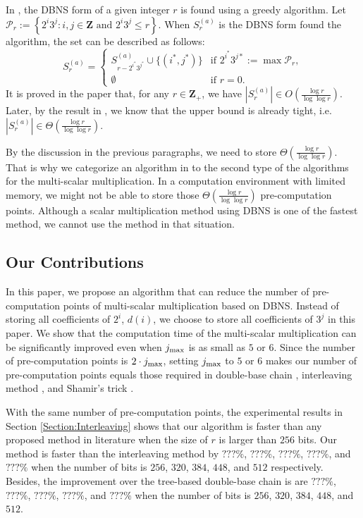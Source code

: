 In \cite{dbns2}, the DBNS form of a given integer $r$ is found using a greedy algorithm. Let $\mathcal{P}_r := \left\{ 2^i3^j : i,j \in \mathbf{Z} \text{ and } 2^i3^j \leq r \right\}$. When $S^{(a)}_r$ is the DBNS form found the algorithm, the set can be described as follows:
\[
S^{(a)}_r =
\begin{cases}
S^{(a)}_{r - 2^{i^*}3^{j^*}} \cup \{(i^*, j^*)\} & \text{if } 2^{i^*}3^{j*} := \max \mathcal{P}_r, \\
\emptyset       & \text{if } r = 0.
\end{cases}
\]
It is proved in the paper that, for any $r \in \mathbf{Z}_+$, we have $\left|S_r^{(a)}\right| \in O(\frac{\log r}{\log \log r})$. Later, by the result in \cite{dbns3}, we know that the upper bound is already tight, i.e. $\left|S_r^{(a)}\right| \in \Theta(\frac{\log r}{\log \log r})$.

By the discussion in the previous paragraphs, we need to store $\Theta(\frac{\log r}{\log \log r})$. That is why we categorize an algorithm in \cite{dbns} to the second type of the algorithms for the multi-scalar multiplication. In a computation environment with limited memory, we might not be able to store those $\Theta(\frac{\log r}{\log \log r})$ pre-computation points. Although a scalar multiplication method using DBNS is one of the fastest method, we cannot use the method in that situation.

\subsection{Our Contributions}

In this paper, we propose an algorithm that can reduce the number of pre-computation points of multi-scalar multiplication based on DBNS. Instead of storing all coefficients of $2^i$, $d(i)$, we choose to store all coefficients of $3^j$ in this paper. We show that the computation time of the multi-scalar multiplication can be significantly improved even when $j_{\rm max}$ is as small as $5$ or $6$. Since the number of pre-computation points is $2 \cdot j_{\rm max}$, setting $j_{\rm max}$ to $5$ or $6$ makes our number of pre-computation points equals those required in double-base chain \cite{experiment,dbc1}, interleaving method \cite{interleaving}, and Shamir's trick \cite{enlarged4}.

With the same number of pre-computation points, the experimental results in Section \ref{Section:Interleaving} shows that our algorithm is faster than any proposed method in literature when the size of $r$ is larger than $256$ bits. Our method is faster than the interleaving method by $???\%$, $???\%$, $???\%$, $???\%$, and $???\%$ when the number of bits is $256$, $320$, $384$, $448$, and $512$ respectively. Besides, the improvement over the tree-based double-base chain is are  $???\%$, $???\%$, $???\%$, $???\%$, and $???\%$ when the number of bits is $256$, $320$, $384$, $448$, and $512$.

